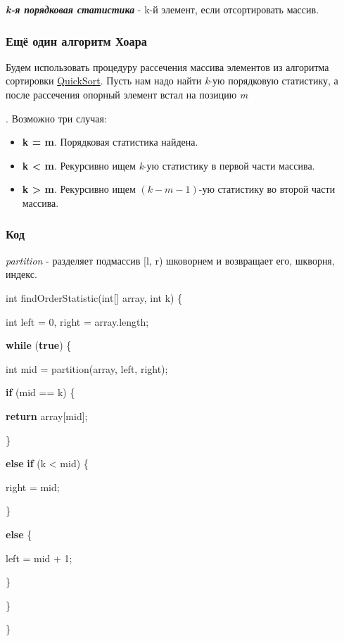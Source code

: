 \documentclass[
]{article}
\newenvironment{Shaded}{}{}
\newcommand{\ControlFlowTok}[1]{\textcolor[rgb]{0.00,0.44,0.13}{\textbf{#1}}}
\newcommand{\DataTypeTok}[1]{\textcolor[rgb]{0.56,0.13,0.00}{#1}}
\newcommand{\DecValTok}[1]{\textcolor[rgb]{0.25,0.63,0.44}{#1}}
\newcommand{\KeywordTok}[1]{\textcolor[rgb]{0.00,0.44,0.13}{\textbf{#1}}}
\newcommand{\NormalTok}[1]{#1}
\begin{document}
\textbf{\emph{k-я порядковая статистика}} - k-й элемент, если
отсортировать массив.

\hypertarget{ux435ux449ux451-ux43eux434ux438ux43d-ux430ux43bux433ux43eux440ux438ux442ux43c-ux445ux43eux430ux440ux430}{%
\subsubsection{Ещё один алгоритм
Хоара}\label{ux435ux449ux451-ux43eux434ux438ux43d-ux430ux43bux433ux43eux440ux438ux442ux43c-ux445ux43eux430ux440ux430}}

Будем использовать процедуру рассечения массива элементов из алгоритма
сортировки
\href{https://neerc.ifmo.ru/wiki/index.php?title=Быстрая_сортировка}{QuickSort}.
Пусть нам надо найти \emph{k}-ую порядковую статистику, а после
рассечения опорный элемент встал на позицию \emph{m}

. Возможно три случая:

\begin{itemize}
\item
  \textbf{k = m}. Порядковая статистика найдена.
\item
  \textbf{k \textless{} m}. Рекурсивно ищем \emph{k}-ую статистику в
  первой части массива.
\item
  \textbf{k \textgreater{} m}. Рекурсивно ищем \((k−m−1)\)-ую статистику
  во второй части массива.
\end{itemize}

\hypertarget{ux43aux43eux434}{%
\subsubsection{Код}\label{ux43aux43eux434}}

\emph{partition} - разделяет подмассив {[}l, r) шковорнем и возвращает
его, шкворня, индекс.

\begin{Shaded}
\begin{Highlighting}[]
\DataTypeTok{int}\NormalTok{ findOrderStatistic(}\DataTypeTok{int}\NormalTok{[] array, }\DataTypeTok{int}\NormalTok{ k) \{
}
  \DataTypeTok{int}\NormalTok{ left = }\DecValTok{0}\NormalTok{, right = array.length;
}
  \ControlFlowTok{while}\NormalTok{ (}\KeywordTok{true}\NormalTok{) \{
}
    \DataTypeTok{int}\NormalTok{ mid = partition(array, left, right);
}


    \ControlFlowTok{if}\NormalTok{ (mid == k) \{
}
      \ControlFlowTok{return}\NormalTok{ array[mid];
}
\NormalTok{    \}
}
    \ControlFlowTok{else} \ControlFlowTok{if}\NormalTok{ (k \textless{} mid) \{
}
\NormalTok{      right = mid;
}
\NormalTok{    \}
}
    \ControlFlowTok{else}\NormalTok{ \{
}
\NormalTok{      left = mid + }\DecValTok{1}\NormalTok{;
}
\NormalTok{    \}
}
\NormalTok{  \}
}
\NormalTok{\}}
\end{Highlighting}
\end{Shaded}
\end{document}
